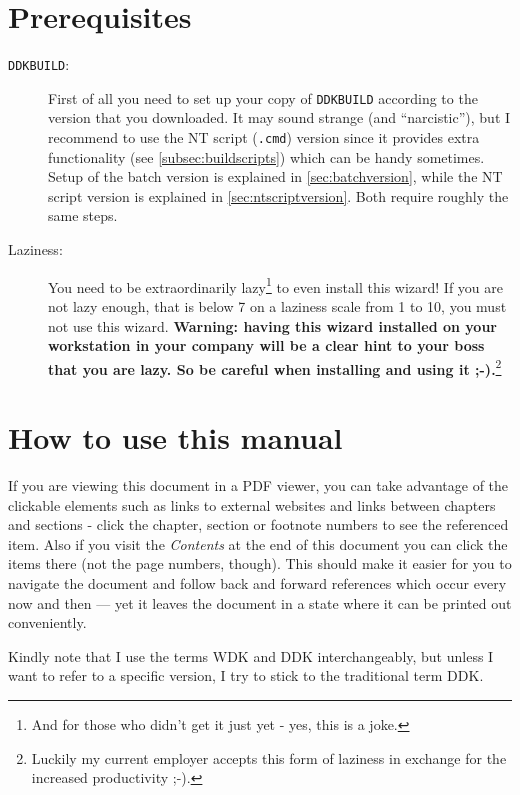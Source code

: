 \documentclass[a4paper,titlepage]{report}
\begin{document}
\section*{Prerequisites}
\begin{description}
  \item[\texttt{DDKBUILD}:] First of all you need to set up your copy of \texttt{DDKBUILD} according to the version
that you downloaded. It may sound strange (and ``narcistic''), but I recommend to
use the NT script (\texttt{.cmd}) version since it provides extra functionality
(see \autoref{subsec:buildscripts})
which can be handy sometimes. Setup of the batch version is explained in \autoref{sec:batchversion},
while the NT script version is explained in \autoref{sec:ntscriptversion}. Both
require roughly the same steps.
  \item[Laziness:] You need to be extraordinarily lazy\footnote{And for those who
didn't get it just yet - yes, this is a joke.} to even install this wizard! If you
are not lazy enough, that is below 7 on a laziness scale from 1 to 10, you must not
use this wizard.
\textbf{Warning: having this wizard installed on your workstation in your
company will be a clear hint to your boss that you are lazy. So be careful when
installing and using it \textsf{;-)}.}\footnote{Luckily my current employer accepts
this form of laziness in exchange for the increased productivity \textsf{;-)}.}
\end{description}

\section*{How to use this manual}
If you are viewing this document in a PDF viewer, you can take advantage of the
clickable elements such as links to external websites and links between
chapters and sections - click the chapter, section or footnote numbers to
see the referenced item. Also if you visit the \emph{Contents} at the end of
this document you can click the items there (not the page numbers, though).
This should make it easier for you to navigate the document and follow
back and forward references which occur every now and then --- yet it leaves
the document in a state where it can be printed out conveniently.

Kindly note that I use the terms WDK and DDK interchangeably, but unless I
want to refer to a specific version, I try to stick to the traditional term
DDK.
\end{document}
